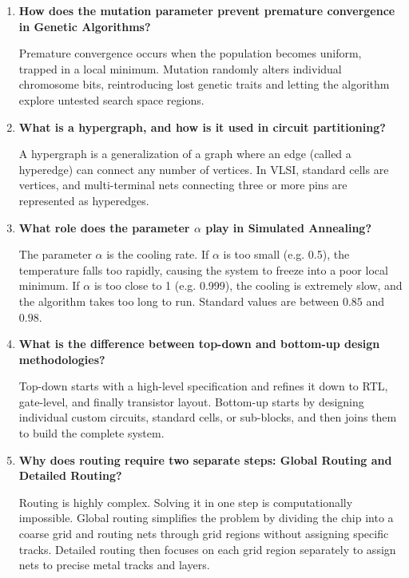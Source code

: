 \documentclass[12pt,a4paper]{article}
\newcommand{\Q}[1]{\textbf{#1}\par\noindent\ignorespaces}
\begin{document}
\begin{tcolorbox}[exambox, title={\textbf{Frequently Asked / Viva Questions}}]
\begin{enumerate}[leftmargin=*, topsep=0pt, label=\textbf{Q\arabic*.}, itemsep=6pt]
  \item \Q{How does the mutation parameter prevent premature convergence in Genetic Algorithms?}
        Premature convergence occurs when the population becomes uniform, trapped in a local minimum. Mutation randomly alters individual chromosome bits, reintroducing lost genetic traits and letting the algorithm explore untested search space regions.
        
  \item \Q{What is a hypergraph, and how is it used in circuit partitioning?}
        A hypergraph is a generalization of a graph where an edge (called a hyperedge) can connect any number of vertices. In VLSI, standard cells are vertices, and multi-terminal nets connecting three or more pins are represented as hyperedges.
        
  \item \Q{What role does the parameter $\alpha$ play in Simulated Annealing?}
        The parameter $\alpha$ is the cooling rate. If $\alpha$ is too small (e.g. 0.5), the temperature falls too rapidly, causing the system to freeze into a poor local minimum. If $\alpha$ is too close to 1 (e.g. 0.999), the cooling is extremely slow, and the algorithm takes too long to run. Standard values are between $0.85$ and $0.98$.
        
  \item \Q{What is the difference between top-down and bottom-up design methodologies?}
        Top-down starts with a high-level specification and refines it down to RTL, gate-level, and finally transistor layout. Bottom-up starts by designing individual custom circuits, standard cells, or sub-blocks, and then joins them to build the complete system.
        
  \item \Q{Why does routing require two separate steps: Global Routing and Detailed Routing?}
        Routing is highly complex. Solving it in one step is computationally impossible. Global routing simplifies the problem by dividing the chip into a coarse grid and routing nets through grid regions without assigning specific tracks. Detailed routing then focuses on each grid region separately to assign nets to precise metal tracks and layers.
\end{enumerate}
\end{tcolorbox}

\vspace{6pt}
\end{document}

